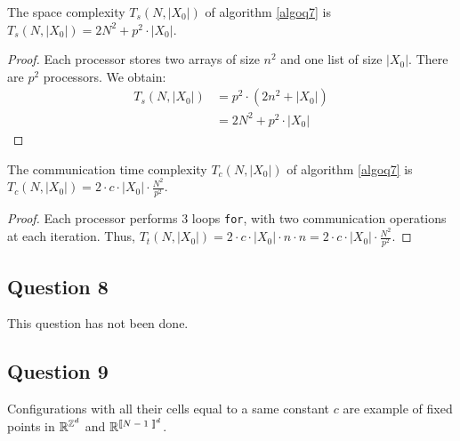 \begin{prop}
 The space complexity $T_s(N,|X_0|)$ of algorithm \ref{algoq7} is $T_s(N,|X_0|) = 2 N^2 + p^2 \cdot |X_0|$.
\end{prop}

\begin{proof}
 Each processor stores two arrays of size $n^2$ and one list of size $|X_0|$. There are $p^2$ processors. We obtain:
 \[
    \begin{split}
        T_s(N,|X_0|) & = p^2 \cdot (2 n^2 + |X_0|) \\
                     & = 2 N^2 + p^2 \cdot |X_0|
    \end{split}
 \] 
\end{proof}

\begin{prop}
 The communication time complexity $T_c(N,|X_0|)$ of algorithm \ref{algoq7} is $T_c(N,|X_0|) = 2 \cdot c \cdot |X_0| \cdot \frac{N^2}{p^2}$.
\end{prop}

\begin{proof}
 Each processor performs 3 loops \texttt{for}, with two communication operations at each iteration. Thus, $T_t(N,|X_0|) = 2 \cdot c \cdot |X_0| \cdot n \cdot n = 2 \cdot c \cdot |X_0| \cdot \frac{N^2}{p^2}$. 
\end{proof}


\subsection*{Question 8}

This question has not been done.


\subsection*{Question 9}

Configurations with all their cells equal to a same constant $c$ are example of fixed points in $\mathbb{R}^{\mathbb{Z}^d}$ and $\RR^{\text{\textlbrackdbl $N-1$ \textrbrackdbl}^d}$.


